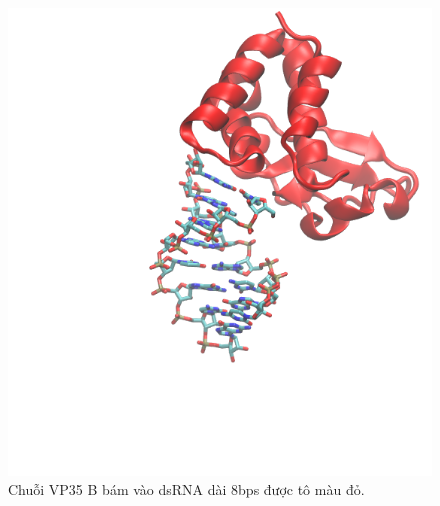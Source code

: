 \documentclass[10pt]{beamer}
\begin{document}
\begin{frame}
\begin{columns}
\begin{column}{0.5\textwidth}
\begin{figure}
					\includegraphics[height=0.6\textheight,natwidth=610,natheight=642]{../VP35_B.png}
					\caption{Chuỗi VP35 B bám vào dsRNA dài 8bps được tô màu đỏ.}
					\label{fig:vp35b}
				\end{figure}
			
			\end{column}
		\end{columns}
	\end{frame}
\end{document}
